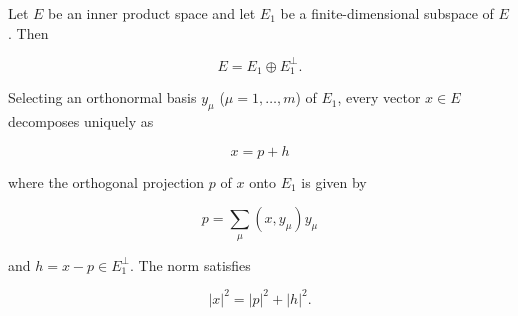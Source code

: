 Let \(E\) be an inner product space and let \(E_1\) be a finite-dimensional subspace of \(E\). Then

$$E = E_1 \oplus E_1^{\perp}.$$

Selecting an orthonormal basis \(y_{\mu}\) (\(\mu = 1, \ldots, m\)) of \(E_1\), every vector \(x \in E\) decomposes uniquely as

$$x = p + h$$

where the orthogonal projection \(p\) of \(x\) onto \(E_1\) is given by

$$p = \sum_{\mu} (x, y_{\mu}) y_{\mu}$$

and \(h = x - p \in E_1^{\perp}\). The norm satisfies

$$|x|^2 = |p|^2 + |h|^2.$$
